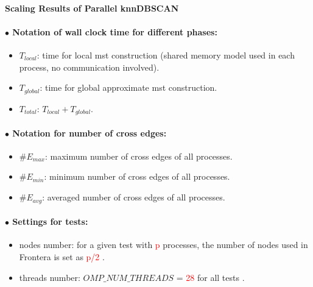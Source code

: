 \documentclass[12pt]{article}
\title{}
\begin{document}
 
\paragraph{\large{Scaling Results of Parallel knnDBSCAN}}

\paragraph{$\bullet$ Notation of wall clock time for different phases:}
    \begin{itemize}
        \item $T_{local}$: time for local mst construction (shared memory model used in each process, no communication involved).
        \item $T_{global}$: time for global approximate mst construction.
        \item $T_{total}$: $T_{local}+T_{global}$.
    \end{itemize}
\paragraph{$\bullet$ Notation for number of cross edges:}
        \begin{itemize}
        \item $\# E_{max}$: maximum number of cross edges of all processes.
        \item $\# E_{min}$: minimum number of cross edges of all processes.
        \item $\# E_{avg}$: averaged number of cross edges of all processes.
    \end{itemize}
    
\paragraph{$\bullet$ Settings for tests:}
    \begin{itemize}
        \item nodes number: for a given test with \textcolor{red}{p} processes, the number of nodes used in Frontera is set as \textcolor{red}{p/2} .
        \item threads number: $OMP\_NUM\_THREADS$ = \textcolor{red}{28} for all tests .
    \end{itemize}
\clearpage

\end{document}
